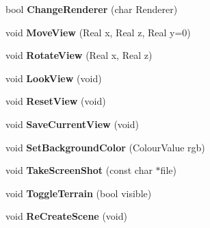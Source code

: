 \begin{DoxyCompactItemize}
\item 
\hypertarget{class_p_f_b_application_a4c9ac46738b5f48e35c0ee0a0f59f14e}{
bool {\bfseries ChangeRenderer} (char Renderer)}
\label{class_p_f_b_application_a4c9ac46738b5f48e35c0ee0a0f59f14e}

\item 
\hypertarget{class_p_f_b_application_a559d4b616e95c40c4c9747a5d9ee8d5b}{
void {\bfseries MoveView} (Real x, Real z, Real y=0)}
\label{class_p_f_b_application_a559d4b616e95c40c4c9747a5d9ee8d5b}

\item 
\hypertarget{class_p_f_b_application_aba9037e8b4873d4259d0731764dce206}{
void {\bfseries RotateView} (Real x, Real z)}
\label{class_p_f_b_application_aba9037e8b4873d4259d0731764dce206}

\item 
\hypertarget{class_p_f_b_application_af81e436dde4e7dce7902a61bc92b2775}{
void {\bfseries LookView} (void)}
\label{class_p_f_b_application_af81e436dde4e7dce7902a61bc92b2775}

\item 
\hypertarget{class_p_f_b_application_afc4b8e1e1c042e5580b9508eff01f3db}{
void {\bfseries ResetView} (void)}
\label{class_p_f_b_application_afc4b8e1e1c042e5580b9508eff01f3db}

\item 
\hypertarget{class_p_f_b_application_a23083c768ae1cda81cf87ee8eaba36c8}{
void {\bfseries SaveCurrentView} (void)}
\label{class_p_f_b_application_a23083c768ae1cda81cf87ee8eaba36c8}

\item 
\hypertarget{class_p_f_b_application_a485f3f908ec6fbc2dfe9f9151e5d4283}{
void {\bfseries SetBackgroundColor} (ColourValue rgb)}
\label{class_p_f_b_application_a485f3f908ec6fbc2dfe9f9151e5d4283}

\item 
\hypertarget{class_p_f_b_application_ae48d5e73e5971d810c52016ac65642eb}{
void {\bfseries TakeScreenShot} (const char $\ast$file)}
\label{class_p_f_b_application_ae48d5e73e5971d810c52016ac65642eb}

\item 
\hypertarget{class_p_f_b_application_ad2177e02c0a5aaa9237091549818bdcc}{
void {\bfseries ToggleTerrain} (bool visible)}
\label{class_p_f_b_application_ad2177e02c0a5aaa9237091549818bdcc}

\item 
\hypertarget{class_p_f_b_application_a0ef5f8325f306b6054564fd1a85e050f}{
void {\bfseries ReCreateScene} (void)}
\label{class_p_f_b_application_a0ef5f8325f306b6054564fd1a85e050f}


\end{DoxyCompactItemize}
